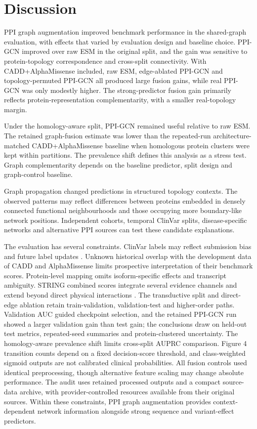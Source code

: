 \documentclass[conference]{IEEEtran}
\newcommand{\CADDAM}{CADD\allowbreak{}+\allowbreak{}AlphaMissense}
\begin{document}
\section{Discussion}

PPI graph augmentation improved benchmark performance in the shared-graph evaluation, with effects that varied by evaluation design and baseline choice. PPI-GCN improved over raw ESM in the original split, and the gain was sensitive to protein-topology correspondence and cross-split connectivity. With \CADDAM{} included, raw ESM, edge-ablated PPI-GCN and topology-permuted PPI-GCN all produced large fusion gains, while real PPI-GCN was only modestly higher. The strong-predictor fusion gain primarily reflects protein-representation complementarity, with a smaller real-topology margin.

Under the homology-aware split, PPI-GCN remained useful relative to raw ESM. The retained graph-fusion estimate was lower than the repeated-run architecture-matched \CADDAM{} baseline when homologous protein clusters were kept within partitions. The prevalence shift defines this analysis as a stress test. Graph complementarity depends on the baseline predictor, split design and graph-control baseline.

Graph propagation changed predictions in structured topology contexts. The observed patterns may reflect differences between proteins embedded in densely connected functional neighbourhoods and those occupying more boundary-like network positions. Independent cohorts, temporal ClinVar splits, disease-specific networks and alternative PPI sources can test these candidate explanations.

The evaluation has several constraints. ClinVar labels may reflect submission bias and future label updates \cite{Landrum2020ClinVar}. Unknown historical overlap with the development data of CADD and AlphaMissense limits prospective interpretation of their benchmark scores. Protein-level mapping omits isoform-specific effects and transcript ambiguity. STRING combined scores integrate several evidence channels and extend beyond direct physical interactions \cite{Szklarczyk2023STRING}. The transductive split and direct-edge ablation retain train-validation, validation-test and higher-order paths. Validation AUC guided checkpoint selection, and the retained PPI-GCN run showed a larger validation gain than test gain; the conclusions draw on held-out test metrics, repeated-seed summaries and protein-clustered uncertainty. The homology-aware prevalence shift limits cross-split AUPRC comparison. Figure 4 transition counts depend on a fixed decision-score threshold, and class-weighted sigmoid outputs are not calibrated clinical probabilities. All fusion controls used identical preprocessing, though alternative feature scaling may change absolute performance. The audit uses retained processed outputs and a compact source-data archive, with provider-controlled resources available from their original sources. Within these constraints, PPI graph augmentation provides context-dependent network information alongside strong sequence and variant-effect predictors.
\end{document}
